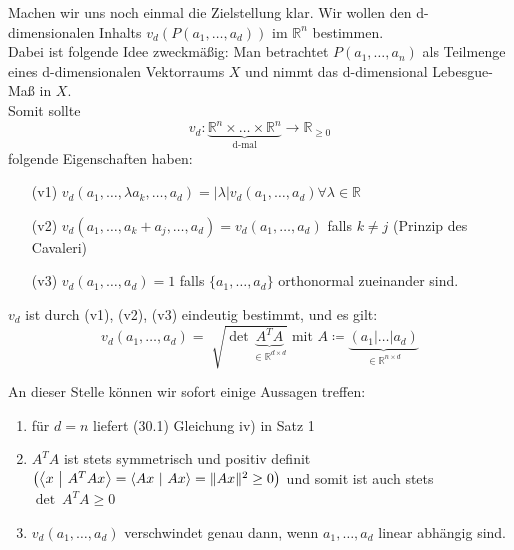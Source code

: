 Machen wir uns noch einmal die Zielstellung klar. Wir wollen den d-dimensionalen Inhalts
$v_d (P(a_1, \ldots, a_d))$ im $\mathbb{R}^n $ bestimmen.\\
Dabei ist folgende Idee zweckmäßig: Man betrachtet $P(a_1, \ldots, a_n)$ als Teilmenge eines d-dimensionalen
Vektorraums $X$ und nimmt das d-dimensional Lebesgue-Maß in $X$.\\
Somit sollte 
\begin{equation*}
	v_d: 
	\underbrace{\mathbb{R}^n \times \ldots \times \mathbb{R}^n }_{\text{d-mal}}
	\rightarrow \mathbb{R}_{\geq 0}
\end{equation*}
folgende Eigenschaften haben:
\begin{enumerate}
    \item[(v1)]
        $v_d (a_1, \ldots, \lambda a_k, \ldots, a_d) = |\lambda| v_d(a_1, \ldots, a_d)
        \forall \lambda \in \mathbb{R} $
    \item[(v2)]
        $v_d (a_1, \ldots, a_k + a_j, \ldots, a_d) = v_d(a_1, \ldots, a_d) $
        falls $k \neq j$ (Prinzip des Cavaleri)
    \item[(v3)]
        $v_d(a_1, \ldots, a_d) = 1 $ falls $\lbrace a_1, \ldots, a_d \rbrace $
        orthonormal zueinander sind.
\end{enumerate}
\newpage
\begin{satz}
    $v_d$ ist durch (v1), (v2), (v3) eindeutig bestimmt, und es gilt:
    \begin{equation}
        v_d(a_1, \ldots, a_d) = 
        \sqrt[]{\det \underbrace{A^T A}_{\in \mathbb{R}^{d \times d}}}
        \text{ mit } 
        A \coloneqq\underbrace{(a_1 | \ldots | a_d)}_{\in \mathbb{R}^{n \times d}}
    \end{equation}
\end{satz}
An dieser Stelle können wir sofort einige Aussagen treffen:\\
\begin{enumerate}
    \item
        für $d=n $ liefert (30.1) Gleichung iv) in Satz 1
    \item
        $A^T A $ ist stets symmetrisch und positiv definit
        $\left( \left\langle x \ \middle| \ A^T Ax\right\rangle=
        \left\langle Ax \ \middle| \ Ax\right\rangle= \|Ax\|^2 \geq 0 \right)$
        und somit ist auch stets $\det\ A^T A \geq 0 $
    \item
        $v_d (a_1, \ldots, a_d)$ verschwindet genau dann, wenn $a_1, \ldots, a_d$ linear abhängig sind.
\end{enumerate}

